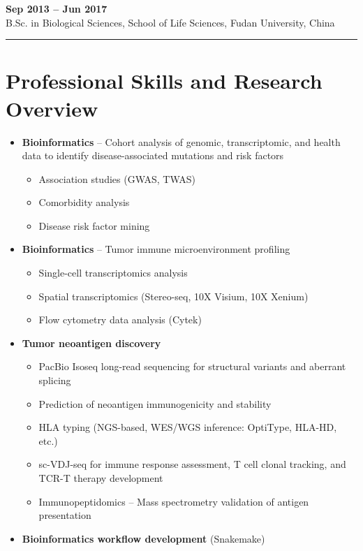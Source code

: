 \documentclass[11pt,a4paper]{article}
\begin{document}
\vspace{0.3em}
\textbf{Sep 2013 -- Jun 2017}\\
B.Sc. in Biological Sciences, School of Life Sciences, Fudan University, China

\vspace{0.5em}
\hrule
\vspace{0.5em}

\section*{Professional Skills and Research Overview}

\begin{itemize}
\item \textbf{Bioinformatics} -- Cohort analysis of genomic, transcriptomic, and health data to identify disease-associated mutations and risk factors
  \begin{itemize}
  \item Association studies (GWAS, TWAS)
  \item Comorbidity analysis
  \item Disease risk factor mining
  \end{itemize}
\item \textbf{Bioinformatics} -- Tumor immune microenvironment profiling
  \begin{itemize}
  \item Single-cell transcriptomics analysis
  \item Spatial transcriptomics (Stereo-seq, 10X Visium, 10X Xenium)
  \item Flow cytometry data analysis (Cytek)
  \end{itemize}
\item \textbf{Tumor neoantigen discovery}
  \begin{itemize}
  \item PacBio Isoseq long-read sequencing for structural variants and aberrant splicing
  \item Prediction of neoantigen immunogenicity and stability
  \item HLA typing (NGS-based, WES/WGS inference: OptiType, HLA-HD, etc.)
  \item sc-VDJ-seq for immune response assessment, T cell clonal tracking, and TCR-T therapy development
  \item Immunopeptidomics -- Mass spectrometry validation of antigen presentation
  \end{itemize}
\item \textbf{Bioinformatics workflow development} (Snakemake)
\end{itemize}
\end{document}
